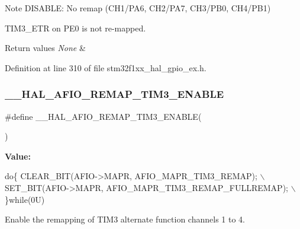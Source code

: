 \begin{DoxyNote}{Note}
D\+I\+S\+A\+B\+LE\+: No remap (C\+H1/\+P\+A6, C\+H2/\+P\+A7, C\+H3/\+P\+B0, C\+H4/\+P\+B1) 

T\+I\+M3\+\_\+\+E\+TR on P\+E0 is not re-\/mapped. 
\end{DoxyNote}

\begin{DoxyRetVals}{Return values}
{\em None} & \\
\hline
\end{DoxyRetVals}


Definition at line 310 of file stm32f1xx\+\_\+hal\+\_\+gpio\+\_\+ex.\+h.

\mbox{\label{group___g_p_i_o_ex___a_f_i_o___a_f___r_e_m_a_p_p_i_n_g_ga276fb7e4041131b65c5bf293180dd052}} 
\subsubsection{\texorpdfstring{\+\_\+\+\_\+\+H\+A\+L\+\_\+\+A\+F\+I\+O\+\_\+\+R\+E\+M\+A\+P\+\_\+\+T\+I\+M3\+\_\+\+E\+N\+A\+B\+LE}{\_\_HAL\_AFIO\_REMAP\_TIM3\_ENABLE}}
{\footnotesize\ttfamily \#define \+\_\+\+\_\+\+H\+A\+L\+\_\+\+A\+F\+I\+O\+\_\+\+R\+E\+M\+A\+P\+\_\+\+T\+I\+M3\+\_\+\+E\+N\+A\+B\+LE(\begin{DoxyParamCaption}{ }\end{DoxyParamCaption})}

{\bfseries Value\+:}
\begin{DoxyCode}
\textcolor{keywordflow}{do}\{ CLEAR\_BIT(AFIO->MAPR, AFIO\_MAPR\_TIM3\_REMAP);         \(\backslash\)
                                            SET\_BIT(AFIO->MAPR, AFIO\_MAPR\_TIM3\_REMAP\_FULLREMAP); \(\backslash\)
                                          \}\textcolor{keywordflow}{while}(0U)
\end{DoxyCode}


Enable the remapping of T\+I\+M3 alternate function channels 1 to 4. 

